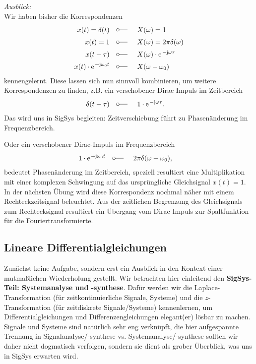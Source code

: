 



\begin{mdframed}
\textit{Ausblick:}
%
\\\noindent
Wir haben bisher die Korrespondenzen
\begin{align}
x(t)= \delta(t) &\quad \fourier \quad X(\omega)=1\\
x(t)= 1 &\quad \fourier \quad X(\omega)=2\pi \delta(\omega)\\
x(t - \tau) & \quad \fourier \quad X(\omega) \cdot \e^{-\im\omega \tau}\\
x(t) \cdot \e^{+\im\omega_0 t} & \quad \fourier \quad X(\omega-\omega_0)
\end{align}
kennengelernt.
%
Diese lassen sich nun sinnvoll kombinieren, um weitere Korrespondenzen zu finden,
z.B. ein verschobener Dirac-Impuls im Zeitbereich
\begin{align}
\delta(t-\tau)& \quad \fourier \quad 1 \cdot \e^{-\im\omega \tau}.
\end{align}
Das wird uns in SigSys begleiten: Zeitverschiebung führt zu Phasenänderung im Frequenzbereich.

Oder ein verschobener Dirac-Impuls im Frequenzbereich
\begin{align}
1 \cdot \e^{+\im\omega_0 t} & \quad \fourier \quad 2\pi\delta(\omega-\omega_0),
\end{align}
bedeutet Phasenänderung im Zeitbereich, speziell resultiert eine Multiplikation
mit einer komplexen Schwingung auf das ursprüngliche Gleichsignal $x(t)=1$.
%
In der nächsten Übung wird diese Korrespondenz nochmal näher mit einem
Rechteckzeitsignal beleuchtet. Aus der zeitlichen Begrenzung des Gleichsignals
zum Rechtecksignal resultiert ein Übergang vom Dirac-Impuls zur Spaltfunktion
für die Fouriertransformierte.
\end{mdframed}














\newpage
\subsection{Lineare Differentialgleichungen}
\label{sec:A7BEE9E24E}
%
Zunächst keine Aufgabe, sondern erst ein Ausblick in den Kontext einer mutmaßlichen Wiederholung
gestellt.
Wir betrachten hier einleitend den \textbf{SigSys-Teil: Systemanalyse und -synthese}.
Dafür werden wir die Laplace-Transformation (für zeitkontinuierliche Signale, Systeme)
und die $z$-Transformation (für zeitdiskrete Signale/Systeme) kennenlernen, um
Differentialgleichungen und Differenzengleichungen elegant(er) lösbar zu machen.
%
Signale und Systeme sind natürlich sehr eng verknüpft, die hier aufgespannte
Trennung in Signalanalyse/-synthese vs. Systemanalyse/-synthese
sollten wir daher nicht dogmatisch verfolgen, sondern sie dient als grober
Überblick, was uns in SigSys erwarten wird.

